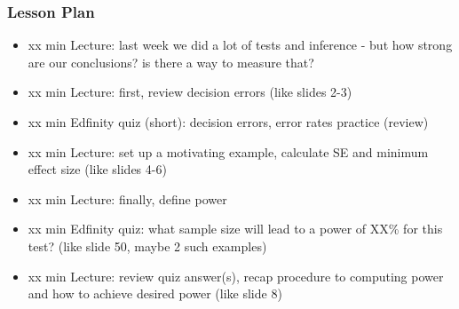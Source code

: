 \begin{frame}
    \frametitle{Lesson Plan}
    \begin{itemize}
        \item xx min Lecture: last week we did a lot of tests and inference - but how strong are our conclusions? is there a way to measure that?
        \item xx min Lecture: first, review decision errors (like slides 2-3)
        \item xx min Edfinity quiz (short): decision errors, error rates practice (review)
        \item xx min Lecture: set up a motivating example, calculate SE and minimum effect size (like slides 4-6)
        \item xx min Lecture: finally, define power
        \item xx min Edfinity quiz: what sample size will lead to a power of XX\% for this test? (like slide 50, maybe 2 such examples) 
        \item xx min Lecture: review quiz answer(s), recap procedure to computing power and how to achieve desired power (like slide 8)
    \end{itemize}
\end{frame}

